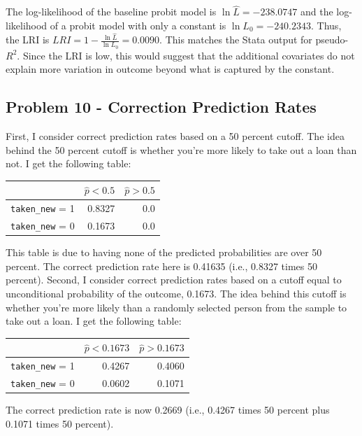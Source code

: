 \documentclass{article}
\begin{document}
The log-likelihood of the baseline probit model is $\ln \hat{L} = -238.0747$ and the log-likelihood of a probit model with only a constant is $\ln L_0 = -240.2343$.  Thus, the LRI is $LRI = 1 - \frac{\ln \hat{L}}{\ln L_0} = 0.0090$. This matches the Stata output for pseudo-$R^2$. Since the LRI is low, this would suggest that the additional covariates do not explain more variation in outcome beyond what is captured by the constant.

\subsection*{Problem 10 - Correction Prediction Rates}

First, I consider correct prediction rates based on a 50 percent cutoff.  The idea behind the 50 percent cutoff is whether you're more likely to take out a loan than not. I get the following table:

\begin{center}
\begin{tabular}{ l | r r }
                   & $\hat{p} < 0.5$ & $\hat{p} > 0.5$\\ 
\hline
\texttt{taken\_new} = 1 &   0.8327 & 0.0 \\  
\texttt{taken\_new} = 0 & 0.1673   & 0.0 
\end{tabular}
\end{center}

This table is due to having none of the predicted probabilities are over 50 percent.  The correct prediction rate here is 0.41635 (i.e., 0.8327 times 50 percent). Second, I consider correct prediction rates based on a cutoff equal to unconditional probability of the outcome,  0.1673.  The idea behind this cutoff is whether you're more likely than a randomly selected person from the sample to take out a loan. I get the following table:

\begin{center}
\begin{tabular}{ l | r r }
 & $\hat{p} < 0.1673$ & $\hat{p} > 0.1673$\\ 
\hline
\texttt{taken\_new} = 1 & 0.4267 & 0.4060 \\  
\texttt{taken\_new} = 0 & 0.0602 & 0.1071
\end{tabular}
\end{center}

The correct prediction rate is now 0.2669 (i.e., 0.4267 times 50 percent plus 0.1071 times 50 percent).

\pagebreak
\end{document}
